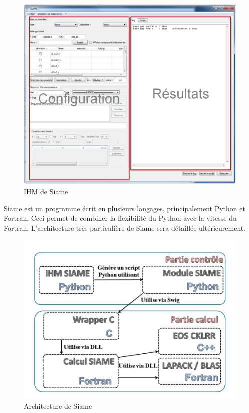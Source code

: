 \begin{figure}[h]
\centering
\includegraphics[scale=0.5]{Siame.png}
\caption{IHM de Siame} 
\label{screen}
\end{figure}

Siame est un programme écrit en plusieurs langages, principalement Python et Fortran. Ceci permet de combiner la flexibilité du Python avec la vitesse du Fortran. L'architecture très particulière de Siame sera détaillée ultérieurement. 

\begin{figure}[h]
\centering
\includegraphics[scale=0.5]{SiameFonct.jpg}
\caption{Architecture de Siame} 
\label{archi}
\end{figure}

